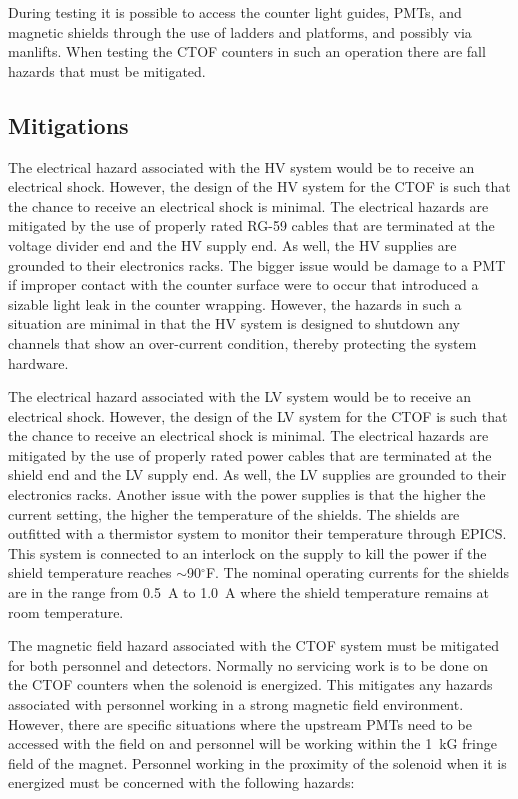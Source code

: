 During testing it is possible to access the counter light guides, PMTs, and magnetic shields
through the use of ladders and platforms, and possibly via manlifts. When testing the CTOF
counters in such an operation there are fall hazards that must be mitigated.

\subsection{Mitigations}

The electrical hazard associated with the HV system would be to receive an electrical shock. 
However, the design of the HV system for the CTOF is such that the chance to receive an 
electrical shock is minimal. The electrical hazards are mitigated by the use of properly
rated RG-59 cables that are terminated at the voltage divider end and the HV supply end. As 
well, the HV supplies are grounded to their electronics racks. The bigger issue would be 
damage to a PMT if improper contact with the counter surface were to occur that introduced 
a sizable light leak in the counter wrapping. However, the hazards in such a situation are 
minimal in that the HV system is designed to shutdown any channels that show an over-current
condition, thereby protecting the system hardware.

The electrical hazard associated with the LV system would be to receive an electrical shock. 
However, the design of the LV system for the CTOF is such that the chance to receive an 
electrical shock is minimal. The electrical hazards are mitigated by the use of properly
rated power cables that are terminated at the shield end and the LV supply end. As well, 
the LV supplies are grounded to their electronics racks. Another issue with the power 
supplies is that the higher the current setting, the higher the temperature of the shields. 
The shields are outfitted with a thermistor system to monitor their temperature through 
EPICS. This system is connected to an interlock on the supply to kill the power if the 
shield temperature reaches $\sim$90$^\circ$F. The nominal operating currents for the shields 
are in the range from 0.5~A to 1.0~A where the shield temperature remains at room temperature.

The magnetic field hazard associated with the CTOF system must be mitigated for both personnel
and detectors. Normally no servicing work is to be done on the CTOF counters when the
solenoid is energized. This mitigates any hazards associated with personnel working in a 
strong magnetic field environment. However, there are specific situations where the upstream 
PMTs need to be accessed with the field on and personnel will be working within the 1~kG 
fringe field of the magnet. Personnel working in the proximity of the solenoid when it is 
energized must be concerned with the following hazards:

